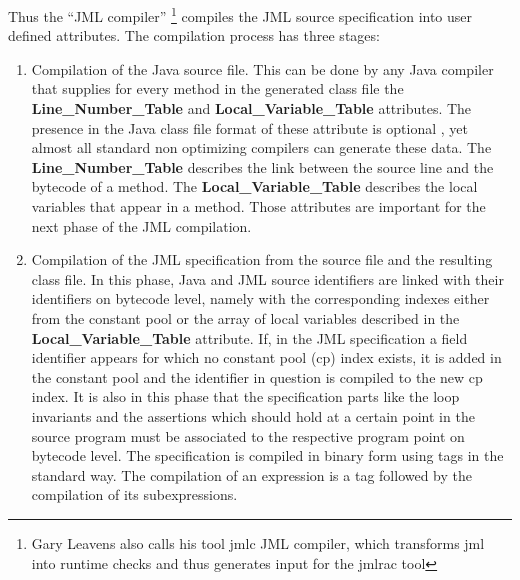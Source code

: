 Thus the ``JML compiler'' \footnote{Gary Leavens also calls his tool jmlc JML compiler, which transforms jml into runtime checks and thus generates input for the jmlrac tool  } compiles the JML source specification into user defined attributes. The compilation process has three stages:
\begin{enumerate}
\item Compilation of the Java source file. This can be done by any Java compiler that supplies for every method in the generated class file 
the \\ \textbf{Line\_Number\_Table} and \textbf{Local\_Variable\_Table}  attributes. The presence in the Java class file format of 
these attribute is optional \cite{VMSpec}, yet almost all standard non optimizing compilers can generate these data. 
The \textbf{Line\_Number\_Table} describes the link between the source line and the bytecode of a method.  
The \textbf{Local\_Variable\_Table} describes the local variables that appear in a method. 
Those attributes are important for the next phase of the JML compilation.
\item Compilation of the JML specification from the source file and the resulting class file. In this phase, Java and JML source identifiers are 
linked with their identifiers on bytecode level, namely with the corresponding indexes either from the constant pool or the array of 
local variables described in the \textbf{Local\_Variable\_Table} attribute. If, in the JML specification a field
identifier appears for which no constant pool (cp) index exists, it is added in the constant pool and the identifier in question
is compiled to the new cp index. It is also in this phase that the specification parts like the loop invariants and the assertions which should hold at a certain point in the source program must be associated to the respective program point on bytecode level. The specification
is compiled in binary form using tags in the standard way. The compilation of an expression is a tag followed by the compilation of its subexpressions. 



\end{enumerate}
